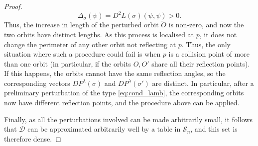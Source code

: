 \documentclass[reqno,11pt]{amsart}
\begin{document}
\begin{proof}
    \begin{equation*}
        \Delta_\sigma(\psi) = D^2L(\sigma)(\psi,\psi) > 0.
    \end{equation*}
    Thus, the increase in length of the perturbed orbit \( \widetilde O \) is non-zero, and now the two orbits have distinct lengths. 
    As this process is localised at \( p \), it does not change the perimeter of any other orbit not reflecting at \( p \).
    Thus, the only situation where such a procedure could fail is when \( p \) is a collision point of more than one orbit (in particular, if the orbits \( O, O' \) share all their reflection points).
    If this happens, the orbits cannot have the same reflection angles, so the corresponding vectors \( DP^\lambda(\sigma) \) and \( DP^\lambda(\sigma') \) are distinct.
    In particular, after a preliminary perturbation of the type \eqref{eq:cond_lamb}, the corresponding orbits now have different reflection points, and the procedure above can be applied.
    \par Finally, as all the perturbations involved can be made arbitrarily small, it follows that \( \mathcal{D} \) can be approximated arbitrarily well by a table in \( \mathcal{S}_n \), and this set is therefore dense.    
\end{proof}

    
\end{document}
